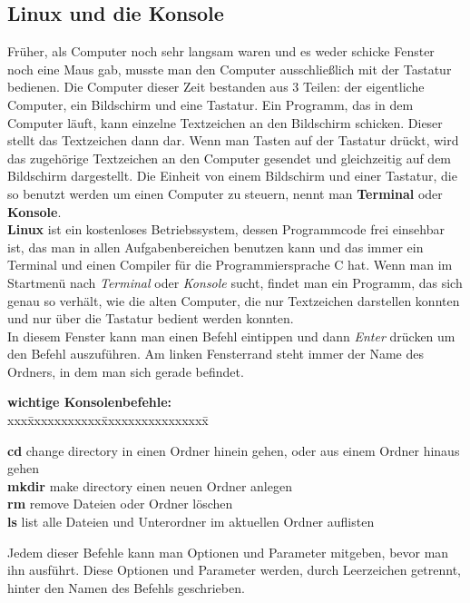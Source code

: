 \documentclass[c_worksheet.tex]{subfiles}
\begin{document}
\subsection{Linux und die Konsole}
Früher, als Computer noch sehr langsam waren und es weder schicke Fenster noch eine Maus gab, musste man den Computer ausschließlich mit der Tastatur bedienen.
Die Computer dieser Zeit bestanden aus 3 Teilen: der eigentliche Computer, ein Bildschirm und eine Tastatur.
Ein Programm, das in dem Computer läuft, kann einzelne Textzeichen an den Bildschirm schicken. Dieser stellt das Textzeichen dann dar.
Wenn man Tasten auf der Tastatur drückt, wird das zugehörige Textzeichen an den Computer gesendet und gleichzeitig auf dem Bildschirm dargestellt.
Die Einheit von einem Bildschirm und einer Tastatur, die so benutzt werden um einen Computer zu steuern, nennt man \textbf{Terminal} oder \textbf{Konsole}.\\

\textbf{Linux} ist ein kostenloses Betriebssystem, dessen Programmcode frei einsehbar ist, das man in allen Aufgabenbereichen benutzen kann und das immer ein Terminal und einen Compiler für die Programmiersprache C hat. Wenn man im Startmenü nach \textit{Terminal} oder \textit{Konsole} sucht, findet man ein Programm, das sich genau so verhält, wie die alten Computer, die nur Textzeichen darstellen konnten und nur über die Tastatur bedient werden konnten.\\
In diesem Fenster kann man einen Befehl eintippen und dann \textit{Enter} drücken um den Befehl auszuführen. Am linken Fensterrand steht immer der Name des Ordners, in dem man sich gerade befindet.\\

\begin{tabbing}
\textbf{wichtige Konsolenbefehle:} \\
xxx\=xxxxxxxxxxx\=xxxxxxxxxxxxxxxx\= \kill

\>\textbf{cd} \>change directory \>in einen Ordner hinein gehen, oder aus einem Ordner hinaus gehen \\
\>\textbf{mkdir} \>make directory \>einen neuen Ordner anlegen \\
\>\textbf{rm} \>remove \>Dateien oder Ordner löschen \\
\>\textbf{ls} \>list \>alle Dateien und Unterordner im aktuellen Ordner auflisten \\
\end{tabbing}
Jedem dieser Befehle kann man Optionen und Parameter mitgeben, bevor man ihn ausführt. Diese Optionen und Parameter werden, durch Leerzeichen getrennt, hinter den Namen des Befehls geschrieben.\\
\end{document}
